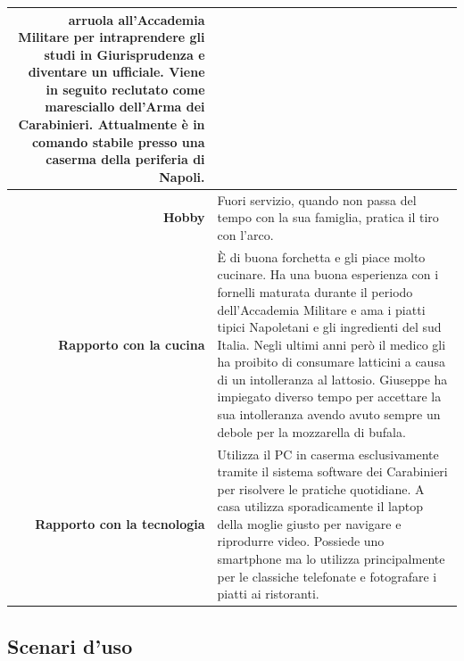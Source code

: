 \begin{table}[H]
\begin{centering}
\begin{tabular} { | r  p{10cm} | }
arruola all'Accademia Militare per intraprendere gli studi in
Giurisprudenza e diventare un ufficiale. Viene in seguito reclutato come
maresciallo dell'Arma dei Carabinieri. Attualmente è in comando stabile
presso una caserma della periferia di Napoli. \\\hline
		\textbf{Hobby} & Fuori servizio, quando non passa del tempo con
la sua famiglia, pratica il tiro con l'arco.\\ \hline
		\textbf{Rapporto con la cucina} & È di buona forchetta e gli
piace molto cucinare. Ha una buona esperienza con i fornelli maturata
durante il periodo dell'Accademia Militare e ama i piatti tipici
Napoletani e gli ingredienti del sud Italia. Negli ultimi anni però il
medico gli ha proibito di consumare latticini a causa di un intolleranza al
lattosio. Giuseppe ha impiegato diverso tempo per accettare la sua
intolleranza avendo avuto sempre un debole per la mozzarella di bufala.\\ \hline
		\textbf{Rapporto con la tecnologia} & Utilizza il PC in caserma
esclusivamente tramite il sistema software dei Carabinieri per risolvere
le pratiche quotidiane. A casa utilizza sporadicamente il
laptop della moglie giusto per navigare e riprodurre video. Possiede uno
smartphone ma lo utilizza principalmente per le classiche telefonate e fotografare i
piatti ai ristoranti.\\ \hline
	\end{tabular}
	\end{centering}
\end{table}
\subsection{Scenari d'uso}


